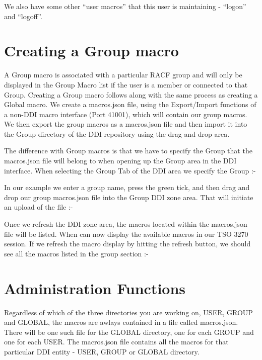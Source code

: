 \documentclass[letterpaper,10pt,english]{sphinxmanual}
\begin{document}

We also have some other “user macros” that this user is maintaining - “logon” and “logoff”.


\section{Creating a Group macro}
\label{\detokenize{TN202002:creating-a-group-macro}}
A Group macro is associated with a particular RACF group and will only be displayed in the Group Macro list if the user is a member or connected to that Group. Creating a Group macro follows along with the same process as creating a Global macro. We create a macros.json file, using the Export/Import functions of a non-DDI macro interface (Port 41001), which will contain our group macros. We then export the group macros as a macros.json file and then import it into the Group directory of the DDI repository using the drag and drop area.

The difference with Group macros is that we have to specify the Group that the macros.json file will belong to when opening up the Group area in the DDI interface. When selecting the Group Tab of the DDI area we specify the Group :-


In our example we enter a group name, press the green tick, and then drag and drop our group macros.json file into the Group DDI zone area. That will initiate an upload of the file :-


Once we refresh the DDI zone area, the macros located within the macros.json file will be listed. When can now display the available macros in our TSO 3270 session. If we refresh the macro display by hitting the refresh button, we should see all the macros listed in the group section :-



\section{Administration Functions}
\label{\detokenize{TN202002:administration-functions}}
Regardless of which of the three directories you are working on, USER, GROUP and GLOBAL, the macros are awlays contained in a file called macros.json. There will be one such file for the GLOBAL directory, one for each GROUP and one for each USER. The macros.json file contains all the macros for that particular DDI entity - USER, GROUP or GLOBAL directory.
\end{document}
